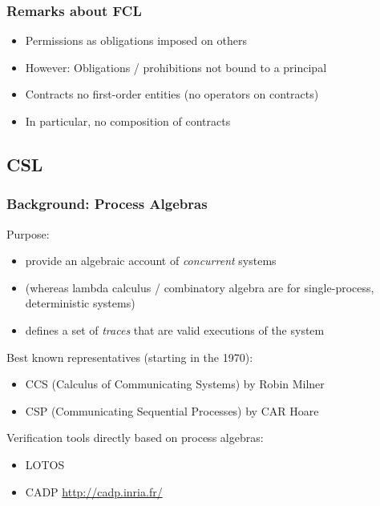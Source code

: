\documentclass{beamer}
\begin{document}
\begin{frame}[fragile]\frametitle{Remarks about FCL}

  \begin{itemize}
  \item Permissions as obligations imposed on others
  \item However: Obligations / prohibitions not bound to a principal 
  \item Contracts no first-order entities (no operators on contracts)
  \item In particular, no composition of contracts
  \end{itemize}

\end{frame}

\subsection{CSL}

\begin{frame}[fragile]\frametitle{Background: Process Algebras}

  Purpose:
  \begin{itemize}
  \item provide an algebraic account of \emph{concurrent} systems
  \item  (whereas lambda calculus / combinatory algebra are for
    single-process, deterministic systems)
  \item defines a set of \emph{traces} that are valid executions of the system
  \end{itemize}

  Best known representatives (starting in the 1970):
  \begin{itemize}
  \item CCS (Calculus of Communicating Systems) by Robin Milner
  \item CSP (Communicating Sequential Processes) by CAR Hoare
  \end{itemize}

  Verification tools directly based on process algebras:
  \begin{itemize}
  \item LOTOS
  \item CADP \url{http://cadp.inria.fr/}
  \end{itemize}

\end{frame}
\end{document}
